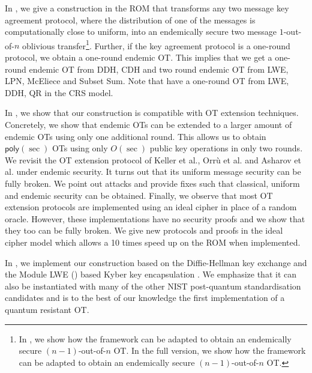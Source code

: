 In , we give a construction in the ROM that transforms any two message key agreement protocol, where the distribution of one of the messages is computationally close to uniform, into an endemically secure two message $1$-out-of-$n$ oblivious transfer\footnote{
\iffullversion 
In , we show how the framework can be adapted to obtain an endemically secure $(n-1)$-out-of-$n$ OT.
\else 
In the full version, we show how the framework can be adapted to obtain an endemically secure $(n-1)$-out-of-$n$ OT.
\fi
}. Further, 
if the key agreement protocol is a one-round protocol, we obtain a one-round endemic OT. This implies that we get a one-round endemic OT from DDH, CDH and two round endemic OT from LWE, LPN, McEliece and Subset Sum. Note that \cite{TCC:GarIshSri18} have a one-round OT from LWE, DDH, QR in the CRS model.

In , we show that our construction is compatible with OT extension techniques. Concretely, we show that endemic OTs can be extended to a larger amount of endemic OTs using only one additional round. This allows us to obtain $\mathsf{poly}(\sec)$ OTs using only $O(\sec)$ public key operations in only two rounds. We revisit the OT extension protocol of Keller et al., Orr{\`u} et al. and Asharov et al. \cite{C:KelOrsSch15,RSA:OrrOrsSch17,JC:ALSZ17} under endemic security. It turns out that its uniform message security can be fully broken. We point out attacks and provide fixes such that classical, uniform and endemic security can be obtained. Finally, we observe that most OT extension protocols are implemented \cite{libOTe,KOS,EMP} using an ideal cipher in place of a random oracle. However, these implementations have no security proofs and we show that they too can be fully broken. We give new protocols and proofs in the ideal cipher model which allows a 10 times speed up on the ROM when implemented.  

In , we implement our construction based on the Diffie-Hellman key exchange and the Module LWE (\MLWE) based Kyber key encapsulation \cite{NISTPQC-R1:CRYSTALS-KYBER17}. We emphasize that it can also be instantiated with many of the other NIST post-quantum standardisation candidates and is to the best of our knowledge the first implementation of a quantum resistant OT.


